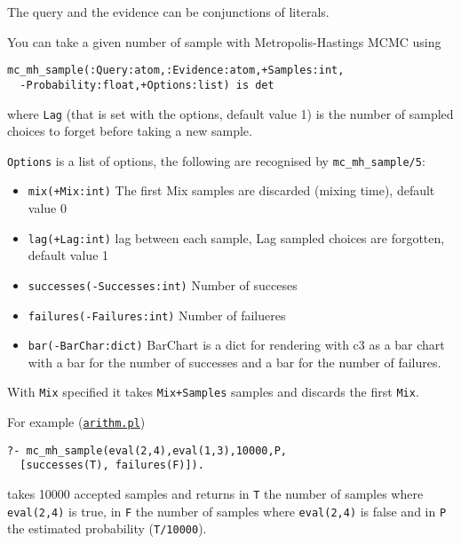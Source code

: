 The query and the evidence can be conjunctions of literals.

You can take a given number of sample with Metropolis-Hastings MCMC using
\begin{verbatim}
mc_mh_sample(:Query:atom,:Evidence:atom,+Samples:int,
  -Probability:float,+Options:list) is det
\end{verbatim}
where \verb|Lag| (that is set with the options, default value 1) is the number of sampled choices to forget before taking a new sample.

\verb|Options| is a list of options, the following are recognised by \verb|mc_mh_sample/5|:
\begin{itemize}
\item \verb|mix(+Mix:int)|
The first Mix samples are discarded (mixing time), default value 0
\item \verb|lag(+Lag:int)|
lag between each sample, Lag sampled choices are forgotten, default value 1
\item \verb|successes(-Successes:int)|
Number of succeses
\item \verb|failures(-Failures:int)|
Number of failueres
\item \verb|bar(-BarChar:dict)|
BarChart is a dict for rendering with c3 as a bar chart with
a bar for the number of successes and a bar for the number
of failures.
\end{itemize}
With \verb|Mix| specified it takes \verb|Mix+Samples| samples and discards the first \verb|Mix|.

For example (\href{http://cplint.eu/e/arithm.pl}{\texttt{arithm.pl}})
\begin{verbatim}
?- mc_mh_sample(eval(2,4),eval(1,3),10000,P,
  [successes(T), failures(F)]).
\end{verbatim}
takes 10000 accepted samples and returns in \verb|T| the number of samples where
\verb|eval(2,4)| is true, in \verb|F| the number of samples where \verb|eval(2,4)| is false and in \verb|P| the
estimated probability (\verb|T/10000|).

